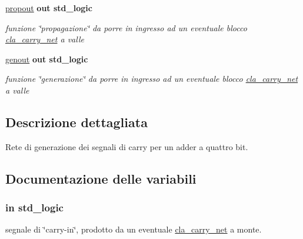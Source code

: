 \begin{DoxyCompactItemize}
\hyperlink{group___carry_network_ga5957c9cdd706cafd2da8855133a002c9}{propout}  {\bfseries {\bfseries \textcolor{vhdlchar}{out}\textcolor{vhdlchar}{ }}} {\bfseries \textcolor{vhdlchar}{std\+\_\+logic}\textcolor{vhdlchar}{ }} 
\begin{DoxyCompactList}\small\item\em funzione \char`\"{}propagazione\char`\"{} da porre in ingresso ad un eventuale blocco \hyperlink{classcla__carry__net}{cla\+\_\+carry\+\_\+net} a valle \end{DoxyCompactList}\item 
\hyperlink{group___carry_network_ga068cd5c4d23e284cb942702252ed1491}{genout}  {\bfseries {\bfseries \textcolor{vhdlchar}{out}\textcolor{vhdlchar}{ }}} {\bfseries \textcolor{vhdlchar}{std\+\_\+logic}\textcolor{vhdlchar}{ }} 
\begin{DoxyCompactList}\small\item\em funzione \char`\"{}generazione\char`\"{} da porre in ingresso ad un eventuale blocco \hyperlink{classcla__carry__net}{cla\+\_\+carry\+\_\+net} a valle \end{DoxyCompactList}\end{DoxyCompactItemize}


\subsection{Descrizione dettagliata}
Rete di generazione dei segnali di carry per un adder a quattro bit. 



\subsection{Documentazione delle variabili}
\hypertarget{group___carry_network_gaa556a73dc4a4de1a0d662b25adbcbe33}{
\subsubsection[{carryin}]{ {\bfseries \textcolor{vhdlchar}{in}\textcolor{vhdlchar}{ }} {\bfseries \textcolor{vhdlchar}{std\+\_\+logic}\textcolor{vhdlchar}{ }} \hspace{0.3cm}{\ttfamily [Port]}}}\label{group___carry_network_gaa556a73dc4a4de1a0d662b25adbcbe33}


segnale di \char`\"{}carry-\/in\char`\"{}, prodotto da un eventuale \hyperlink{classcla__carry__net}{cla\+\_\+carry\+\_\+net} a monte. 

